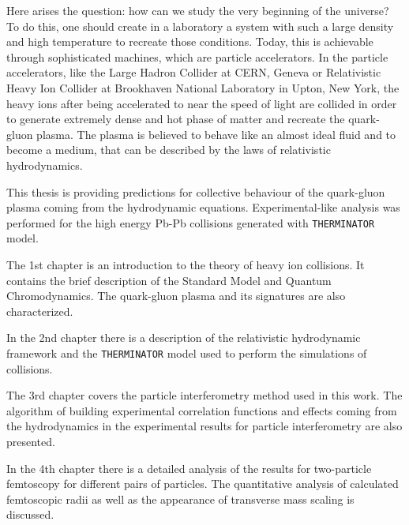 Here arises the question: how can we study the very beginning of the universe?
To do this, one should create in a laboratory a system with such a large density and high temperature to recreate those conditions.
Today, this is achievable through sophisticated machines, which are particle accelerators.
In the particle accelerators, like the Large Hadron Collider at CERN, Geneva or Relativistic Heavy Ion Collider at Brookhaven National Laboratory in Upton, New York, the heavy ions after being accelerated to near the speed of light are collided in order to generate extremely dense and hot phase of matter and recreate the quark-gluon plasma.
The plasma is believed to behave like an almost ideal fluid and to become a medium, that can be described by the laws of relativistic hydrodynamics.

This thesis is providing predictions for collective behaviour of the quark-gluon plasma coming from the hydrodynamic equations.
Experimental-like analysis was performed for the high energy Pb-Pb collisions generated with \verb|THERMINATOR| model.

The 1st chapter is an introduction to the theory of heavy ion collisions.
It contains the brief description of the Standard Model and Quantum Chromodynamics.
The quark-gluon plasma and its signatures are also characterized.

In the 2nd chapter there is a description of the relativistic hydrodynamic framework and the \verb|THERMINATOR| model used to perform the simulations of collisions.

The 3rd chapter covers the particle interferometry method used in this work.
The algorithm of building experimental correlation functions and effects coming from the hydrodynamics in the experimental results for particle interferometry are also presented.

In the 4th chapter there is a detailed analysis of the results for two-particle femtoscopy for different pairs of particles.
The quantitative analysis of calculated femtoscopic radii as well as the appearance of transverse mass scaling is discussed.